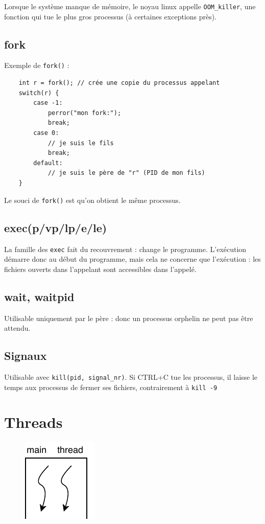\documentclass[11pt]{article}
\begin{document}
Lorsque le système manque de mémoire, le noyau linux appelle \texttt{OOM_killer}, une fonction qui tue le plus gros processus (à certaines exceptions près).

\subsection{fork}
Exemple de \texttt{fork()} :
\begin{verbatim}
    int r = fork(); // crée une copie du processus appelant
    switch(r) {
        case -1:
            perror("mon fork:");
            break;
        case 0:
            // je suis le fils
            break;
        default:
            // je suis le père de "r" (PID de mon fils)
    }
\end{verbatim}
Le souci de \texttt{fork()} est qu'on obtient le même processus.

\subsection{exec(p/vp/lp/e/le)}
La famille des \texttt{exec} fait du recouvrement : change le programme. L'exécution démarre donc au début du programme, mais cela ne concerne que l'exécution : les fichiers ouverts dans l'appelant sont accessibles dans l'appelé.

\subsection{wait, waitpid}
Utilisable uniquement par le père : donc un processus orphelin ne peut pas être attendu.

\subsection{Signaux}
Utilisable avec \texttt{kill(pid, signal_nr)}.
Si CTRL+C tue les processus, il laisse le temps aux processus de fermer ses fichiers, contrairement à \texttt{kill -9}

\section{Threads}

\begin{figure}[ht]
    \centering
    \includegraphics{img/c2-main-thread.pdf}
\end{figure}
\end{document}
